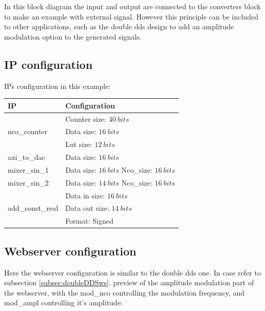 \documentclass[12pt,oneside]{article}
\begin{document}
In this block diagram the input and output are connected to the converters block to make an example with external signal. However this principle can be included to other applications, such as the double dds design to add an amplitude modulation option to the generated signals.

\subsection{IP configuration}
\vspace{0.5cm}
IPs configuration in this example:
\begin{center}
	\begin{tabular}{|>{\centering\arraybackslash}m{.3\linewidth} | >{\centering\arraybackslash}m{.3\linewidth} |}
		\hline
		IP & Configuration \\
		\hline
		& Counter size: $40~bits$\\ nco\_counter &Data size: $16~bits$\\ &Lut size: $12~bits$ \\
		\hline
		axi\_to\_dac&Data size: $16~bits$ \\
		\hline
		mixer\_sin\_1&Data size: $16~bits$ \newline Nco\_size: $16~bits$ \\
		mixer\_sin\_2&Data size: $14~bits$ \newline Nco\_size: $16~bits$ \\
		\hline
		& Data in size: $16~bits$\\add\_const\_real & Data out size: $14~bits$\\ &Format: Signed \\
		\hline
	\end{tabular}
\end{center}
\vspace{0.1cm}
\subsection{Webserver configuration}

Here the webserver configuration is similar to the double dds one. In case refer to subsection \ref{subsec:doubleDDSws}. preview of the amplitude modulation part of the webserver, with the mod\_nco controlling the modulation frequency, and mod\_ampl controlling it's amplitude:
\end{document}
